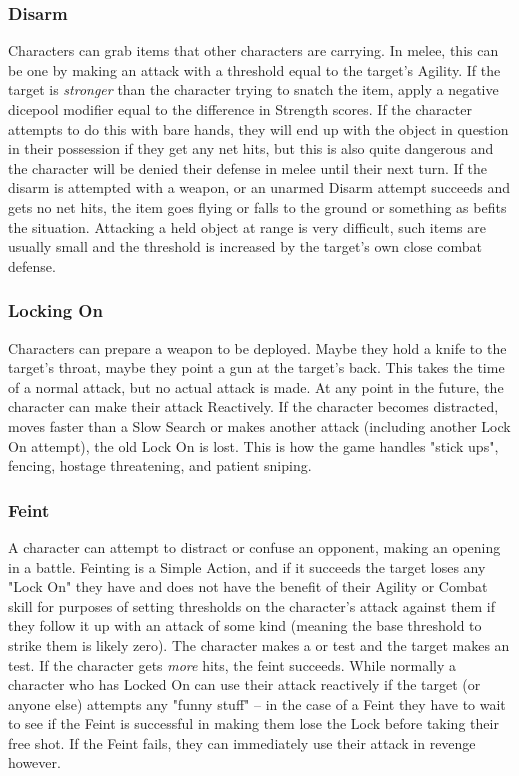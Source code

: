 \subsubsection{Disarm}\hspace{\parindent}  Characters can grab items that other characters are carrying. In melee, this can be one by making an attack with a threshold equal to the target's Agility. If the target is \textit{stronger} than the character trying to snatch the item, apply a negative dicepool modifier equal to the difference in Strength scores. If the character attempts to do this with bare hands, they will end up with the object in question in their possession if they get any net hits, but this is also quite dangerous and the character will be denied their defense in melee until their next turn. If the disarm is attempted with a weapon, or an unarmed Disarm attempt succeeds and gets no net hits, the item goes flying or falls to the ground or something as befits the situation. Attacking a held object at range is very difficult, such items are usually small and the threshold is increased by the target's own close combat defense.

\subsubsection{Locking On}\hspace{\parindent}  Characters can prepare a weapon to be deployed. Maybe they hold a knife to the target's throat, maybe they point a gun at the target's back. This takes the time of a normal attack, but no actual attack is made. At any point in the future, the character can make their attack Reactively. If the character becomes distracted, moves faster than a Slow Search or makes another attack (including another Lock On attempt), the old Lock On is lost. This is how the game handles "stick ups", fencing, hostage threatening, and patient sniping.

\subsubsection{Feint}\hspace{\parindent}  A character can attempt to distract or confuse an opponent, making an opening in a battle. Feinting is a Simple Action, and if it succeeds the target loses any "Lock On" they have and does not have the benefit of their Agility or Combat skill for purposes of setting thresholds on the character's attack against them if they follow it up with an attack of some kind (meaning the base threshold to strike them is likely zero). The character makes a  or  test and the target makes an  test. If the character gets \textit{more} hits, the feint succeeds. While normally a character who has Locked On can use their attack reactively if the target (or anyone else) attempts any "funny stuff" -- in the case of a Feint they have to wait to see if the Feint is successful in making them lose the Lock before taking their free shot. If the Feint fails, they can immediately use their attack in revenge however.

